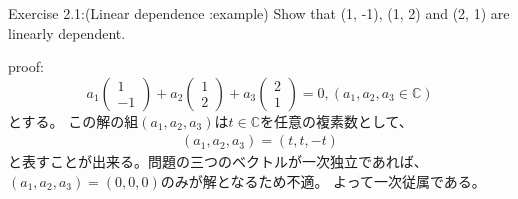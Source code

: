 \begin{flushleft}
{\large Exercise 2.1:(Linear dependence :example) }
Show that (1, -1), (1, 2) and (2, 1) are linearly dependent.

\large proof:
\begin{equation}
a_1\left(
	\begin{array}{c}
	1\\
	-1
	\end{array}
\right)
+ a_2\left(
	\begin{array}{c}
	1\\
	2
	\end{array}
\right)
+ a_3
\left(
	\begin{array}{c}
	2\\
	1
	\end{array}
\right)
= 0
, (a_1, a_2, a_3 \in \mathbb{C})
\end{equation}
とする。
\newline
この解の組$(a_1, a_2, a_3)$は$t\in \mathbb{C}$を任意の複素数として、
\begin{eqnarray}
(a_1, a_2, a_3) = (t, t, -t)
\end{eqnarray}
と表すことが出来る。問題の三つのベクトルが一次独立であれば、
$(a_1, a_2, a_3) = (0, 0, 0)$のみが解となるため不適。
よって一次従属である。
\end{flushleft}

